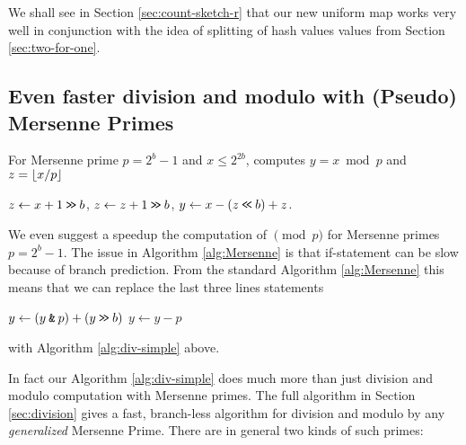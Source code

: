 We shall see in Section \ref{sec:count-sketch-r} that our new uniform map
works very well in conjunction with the idea of splitting of hash values 
values from Section \ref{sec:two-for-one}.




\subsection{Even faster division and modulo with (Pseudo) Mersenne Primes}
%
\begin{algorithm}\label{alg:div-simple}
   \caption{For Mersenne prime $p=2^b-1$ and $x\leq 2^{2b}$, computes
   $y=x\bmod p$ and $z=\lfloor {x/p} \rfloor$}
   \begin{algorithmic}
      \State $z \gets x+1 \mathbin{\texttt{>\!>}} b$,
      \State $z \gets z+1 \mathbin{\texttt{>\!>}} b$,
      \State $y \gets x - (z \mathbin{\texttt{<\!<}} b) + z$.
   \end{algorithmic}
\end{algorithm}
%
We even suggest a speedup the computation of $\pmod p$ for Mersenne primes
$p=2^b-1$. The issue in Algorithm \ref{alg:Mersenne} is that
if-statement can be slow because of branch prediction.
From the standard Algorithm \ref{alg:Mersenne} this means that we can
replace the last three lines statements
\begin{algorithmic}
   \State $y \gets (y\mathbin{\texttt{\&}} p)+(y\mathbin{\texttt{>\!>}} b)$
      \State $y\gets y-p$
   \EndIf
\end{algorithmic}
with Algorithm \ref{alg:div-simple} above.

\vspace{1em}

In fact our Algorithm \ref{alg:div-simple} does much more than just division and modulo computation with Mersenne primes.
The full algorithm in Section \ref{sec:division} gives a fast, branch-less algorithm for division and modulo by any \emph{generalized} Mersenne Prime.
There are in general two kinds of such primes:

